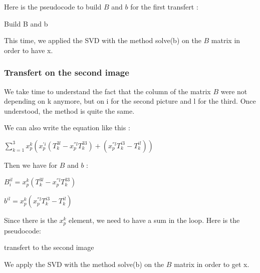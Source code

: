 \documentclass{report}
\begin{document}
Here is the pseudocode to build $B$ and $b$ for the first transfert : 
\begin{algorithm}
\SetLine
\caption{Build B and b}
\SetLine
{}
\end{algorithm}

This time, we applied the SVD with the method solve(b) on the $B$ matrix in order to have x. 

\subsubsection{Transfert on the second image}
We take time to understand the fact that the column of the matrix $B$ were not depending on k anymore, but on i for the second picture and l for the third. Once understood, the method is quite the same. 

We can also write the equation like this : 

\begin{center}
 $ \displaystyle { \sum_{k = 1}^{3}} x_{p}^{k}(x_{p}^{'i} (T_{k}^{3l} - x_{p}^{''l}T_{k}^{33}) + ( x_{p}^{''l}T_{k}^{i3} - T_{k}^{il} ))$
\end{center}

Then we have for $B$ and $b$ :  
\begin{center}
$B_{i}^{il} = x_{p}^{k}(T_{k}^{3l} - x_{p}^{''l}T_{k}^{33})$
\end{center}
\begin{center}
$b^{il} = x_{p}^{k}(x_{p}^{''l}T_{k}^{i3} - T_{k}^{il})$
\end{center}

Since there is the $x_{p}^{k}$ element, we need to have a sum in the loop. Here is the pseudocode:

\begin{algorithm}
\SetLine
\caption{transfert to the second image}
\SetLine
{}
\end{algorithm}
We apply the SVD with the method solve(b) on the $B$ matrix in order to get x. 
\end{document}
